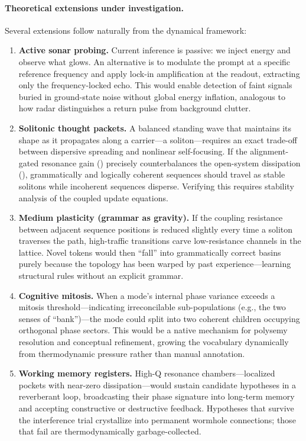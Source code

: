 \documentclass[11pt,a4paper]{article}
\begin{document}
\paragraph{Theoretical extensions under investigation.}
Several extensions follow naturally from the dynamical framework:
\begin{enumerate}[nosep]
\item \textbf{Active sonar probing.}
Current inference is passive: we inject energy and observe what glows. An alternative is to modulate the prompt at a specific reference frequency and apply lock-in amplification at the readout, extracting only the frequency-locked echo. This would enable detection of faint signals buried in ground-state noise without global energy inflation, analogous to how radar distinguishes a return pulse from background clutter.
\item \textbf{Solitonic thought packets.}
A balanced standing wave that maintains its shape as it propagates along a carrier---a soliton---requires an exact trade-off between dispersive spreading and nonlinear self-focusing. If the alignment-gated resonance gain () precisely counterbalances the open-system dissipation (), grammatically and logically coherent sequences should travel as stable solitons while incoherent sequences disperse. Verifying this requires stability analysis of the coupled update equations.
\item \textbf{Medium plasticity (grammar as gravity).}
If the coupling resistance between adjacent sequence positions is reduced slightly every time a soliton traverses the path, high-traffic transitions carve low-resistance channels in the lattice. Novel tokens would then ``fall'' into grammatically correct basins purely because the topology has been warped by past experience---learning structural rules without an explicit grammar.
\item \textbf{Cognitive mitosis.}
When a mode's internal phase variance exceeds a mitosis threshold---indicating irreconcilable sub-populations (e.g., the two senses of ``bank'')---the mode could split into two coherent children occupying orthogonal phase sectors. This would be a native mechanism for polysemy resolution and conceptual refinement, growing the vocabulary dynamically from thermodynamic pressure rather than manual annotation.
\item \textbf{Working memory registers.}
High-Q resonance chambers---localized pockets with near-zero dissipation---would sustain candidate hypotheses in a reverberant loop, broadcasting their phase signature into long-term memory and accepting constructive or destructive feedback. Hypotheses that survive the interference trial crystallize into permanent wormhole connections; those that fail are thermodynamically garbage-collected.
\end{enumerate}
\end{document}
